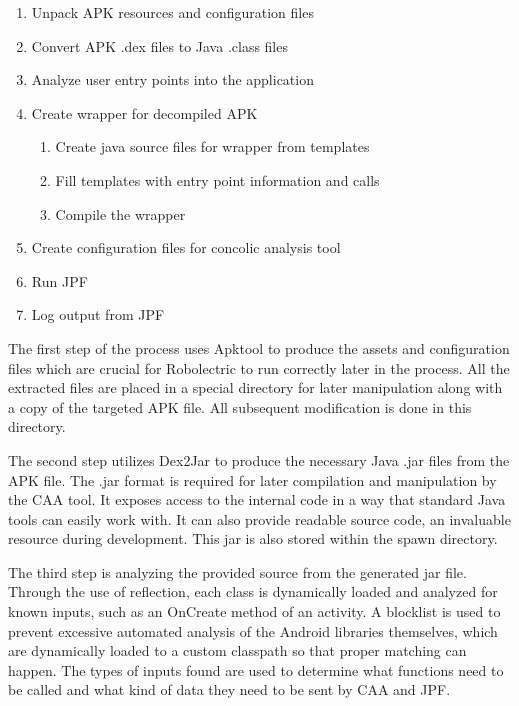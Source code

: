 \documentclass{sig-alternate-05-2015}
\begin{document}
\begin{enumerate}

    \setlength{\itemsep}{0pt} %
    \setlength{\parskip}{0pt} %
    \setlength{\parsep}{0pt}  %

 \item Unpack APK resources and configuration files
 \item Convert APK .dex files to Java .class files
  \item Analyze user entry points into the application
 \item Create wrapper for decompiled APK
 \begin{enumerate}
\itemsep-.2em %
 	\item Create java source files for wrapper from templates
 	\item Fill templates with entry point information and calls
 	\item Compile the wrapper
 \end{enumerate}
 \item Create configuration files for concolic analysis tool
 \item Run JPF
 \item Log output from JPF
 \end{enumerate}



The first step of the process uses Apktool to produce the assets and configuration files which are crucial for Robolectric to run correctly later in the process. All the extracted files are placed in a special directory for later manipulation along with a copy of the targeted APK file.  All subsequent modification is done in this directory.

The second step utilizes Dex2Jar to produce the necessary Java .jar files from the APK file. The .jar format is required for later compilation and manipulation by the CAA tool. It exposes access to the internal code in a way that standard Java tools can easily work with. It can also provide readable source code, an invaluable resource during development. This jar is also stored within the spawn directory.

The third step is analyzing the provided source from the generated jar file. Through the use of reflection, each class is dynamically loaded and analyzed for known inputs, such as an OnCreate method of an activity. A blocklist is used to prevent excessive automated analysis of the Android libraries themselves, which are dynamically loaded to a custom classpath so that proper matching can happen.  The types of inputs found are used to determine what functions need to be called and what kind of data they need to be sent by CAA and JPF.
\end{document}
